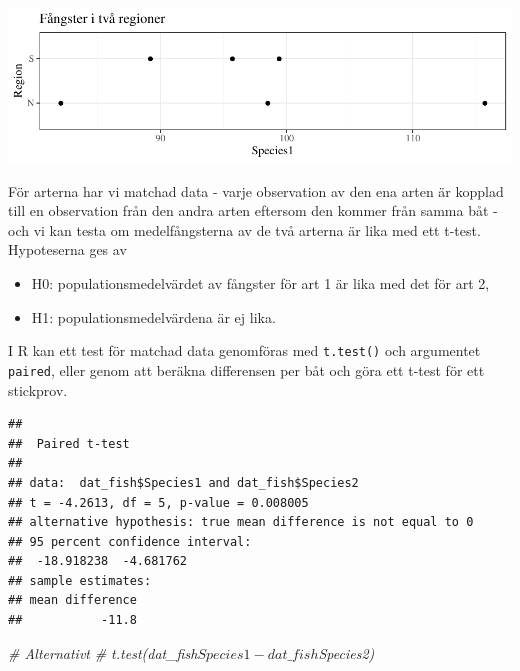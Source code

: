 \documentclass[
]{book}
\newenvironment{Shaded}{\begin{snugshade}}{\end{snugshade}}
\newcommand{\AttributeTok}[1]{\textcolor[rgb]{0.13,0.29,0.53}{#1}}
\newcommand{\CommentTok}[1]{\textcolor[rgb]{0.56,0.35,0.01}{\textit{#1}}}
\newcommand{\FunctionTok}[1]{\textcolor[rgb]{0.13,0.29,0.53}{\textbf{#1}}}
\newcommand{\NormalTok}[1]{#1}
\newcommand{\SpecialCharTok}[1]{\textcolor[rgb]{0.81,0.36,0.00}{\textbf{#1}}}
\providecommand{\tightlist}{%
  \setlength{\itemsep}{0pt}\setlength{\parskip}{0pt}}
\theoremstyle{definition}
\theoremstyle{definition}
\theoremstyle{definition}
\theoremstyle{definition}
\theoremstyle{remark}
\begin{document}
\begin{center}\includegraphics{R-anvisningar_files/figure-latex/unnamed-chunk-203-1} \end{center}

För arterna har vi matchad data - varje observation av den ena arten är kopplad till en observation från den andra arten eftersom den kommer från samma båt - och vi kan testa om medelfångsterna av de två arterna är lika med ett t-test. Hypoteserna ges av

\begin{itemize}
\tightlist
\item
  H0: populationsmedelvärdet av fångster för art 1 är lika med det för art 2,
\item
  H1: populationsmedelvärdena är ej lika.
\end{itemize}

I R kan ett test för matchad data genomföras med \texttt{t.test()} och argumentet \texttt{paired}, eller genom att beräkna differensen per båt och göra ett t-test för ett stickprov.

\begin{Shaded}
\end{Shaded}

\begin{verbatim}
## 
##  Paired t-test
## 
## data:  dat_fish$Species1 and dat_fish$Species2
## t = -4.2613, df = 5, p-value = 0.008005
## alternative hypothesis: true mean difference is not equal to 0
## 95 percent confidence interval:
##  -18.918238  -4.681762
## sample estimates:
## mean difference 
##           -11.8
\end{verbatim}

\begin{Shaded}
\begin{Highlighting}[]
\CommentTok{\# Alternativt}
\CommentTok{\# t.test(dat\_fish$Species1 {-} dat\_fish$Species2)}
\end{Highlighting}
\end{Shaded}
\end{document}
